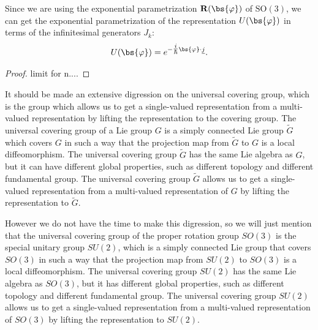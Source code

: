 \begin{example}
    Since we are using the exponential parametrization \(\mathbf{R}(\bs{\varphi})\) of \(\mathrm{SO}(3)\), we can get the exponential parametrization of the representation \(U(\bs{\varphi})\) in terms of the infinitesimal generators \(J_k\):
    \[
        U(\bs{\varphi}) = e^{-\tfrac{i}{\hbar} \bs{\varphi} \cdot \underline{j}}.
    \]
    \begin{proof}
        limit for n....
    \end{proof}

\end{example}


It should be made an extensive digression on the universal covering group, which is the group which allows us to get a single-valued representation from a multi-valued representation by lifting the representation to the covering group. The universal covering group of a Lie group \(G\) is a simply connected Lie group \(\tilde{G}\) which covers \(G\) in such a way that the projection map from \(\tilde{G}\) to \(G\) is a local diffeomorphism. The universal covering group \(\tilde{G}\) has the same Lie algebra as \(G\), but it can have different global properties, such as different topology and different fundamental group. The universal covering group \(\tilde{G}\) allows us to get a single-valued representation from a multi-valued representation of \(G\) by lifting the representation to \(\tilde{G}\).

However we do not have the time to make this digression, so we will just mention that the universal covering group of the proper rotation group \(SO(3)\) is the special unitary group \(SU(2)\), which is a simply connected Lie group that covers \(SO(3)\) in such a way that the projection map from \(SU(2)\) to \(SO(3)\) is a local diffeomorphism. The universal covering group \(SU(2)\) has the same Lie algebra as \(SO(3)\), but it has different global properties, such as different topology and different fundamental group. The universal covering group \(SU(2)\) allows us to get a single-valued representation from a multi-valued representation of \(SO(3)\) by lifting the representation to \(SU(2)\).